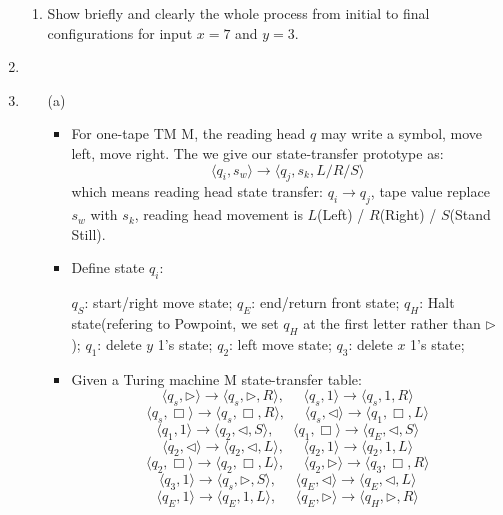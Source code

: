 \documentclass[12pt,a4paper]{article}
\makeatletter
\newtheorem*{solution}{Solution}
\theoremstyle{definition}
\renewenvironment{solution}[1][Solution] {\par\pushQED{\qed}\normalfont\topsep6\p@\@plus6\p@\relax\trivlist\item[\hskip\labelsep\bfseries#1\@addpunct{.}]\ignorespaces}{\popQED\endtrivlist\@endpefalse} \makeatother
\makeatother
\begin{document}
\begin{enumerate}
\begin{enumerate}
        \item
        Show briefly and clearly the whole process from initial to final configurations for input $x = 7$ and $y = 3$.
    \end{enumerate}

    \begin{solution}\item
    \renewcommand{\qedsymbol}{}
    \begin{itemize}
    \item [(a)] 
    \begin{itemize}
    \item For one-tape TM M, the reading head $q$ may write a symbol, move left, move right. The we give our state-transfer prototype as:
    $$\langle q_i , s_w \rangle \rightarrow \langle q_j , s_k , L/R/S\rangle$$
    which means reading head state transfer: $q_{i} \rightarrow q_{j}$, tape value replace $s_w$ with $s_k$, reading head movement is $L$(Left) / $R$(Right) / $S$(Stand Still).
    \item Define state $q_{i}$:\par 
    $q_{S}$: start/right move state; $q_{E}$: end/return front state; $q_{H}$: Halt state(refering to Powpoint, we set $q_{H}$ at the first letter rather than $\triangleright$); $q_{1}$: delete $y$ 1's state; $q_{2}$: left move state; $q_{3}$: delete $x$ 1's state;
    \item Given a Turing machine M state-transfer table:
    $$\langle q_s , \triangleright \rangle \rightarrow \langle q_s , \triangleright , R\rangle,\ \ \ \ \  \ \langle q_s , 1 \rangle \rightarrow \langle q_s , 1 , R\rangle$$
    $$\langle q_s , \Box \rangle \rightarrow \langle q_s , \Box , R\rangle,\ \ \ \ \  \ \langle q_s , \triangleleft \rangle \rightarrow \langle q_1 , \Box , L\rangle$$
    $$\langle q_1 , 1 \rangle \rightarrow \langle q_2 , \triangleleft , S\rangle,\ \ \ \ \  \ \langle q_1 , \Box \rangle \rightarrow \langle q_E , \triangleleft , S\rangle$$
    $$\langle q_2 , \triangleleft \rangle \rightarrow \langle q_2 , \triangleleft , L\rangle,\ \ \ \ \  \ \langle q_2 , 1 \rangle \rightarrow \langle q_2 , 1 , L\rangle$$
    $$\langle q_2 , \Box \rangle \rightarrow \langle q_2 , \Box , L\rangle,\ \ \ \ \  \ \langle q_2 , \triangleright \rangle \rightarrow \langle q_3 , \Box , R\rangle$$
    $$\langle q_3 , 1 \rangle \rightarrow \langle q_s , \triangleright , S\rangle,\ \ \ \ \  \ \langle q_E , \triangleleft \rangle \rightarrow \langle q_E , \triangleleft , L\rangle$$
    $$\langle q_E , 1 \rangle \rightarrow \langle q_E , 1 , L\rangle,\ \ \ \ \  \ \langle q_E , \triangleright \rangle \rightarrow \langle q_H , \triangleright , R\rangle$$

\end{itemize}
\end{itemize}
\end{solution}
\end{enumerate}
\end{document}
